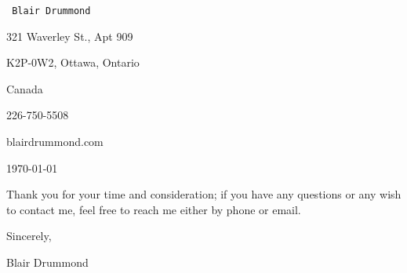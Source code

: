 

% 
% 

\enablehyperlinks


\newif\ifcanada


{\tt
\startright
Blair Drummond \par
321 Waverley St., Apt 909 \par
K2P-0W2, Ottawa, Ontario \par
Canada \par
226-750-5508 \par
blairdrummond\@protonmail.com \par
\bigskip
\today
\endright
}

\canadatrue



\bigskip
\bigskip

Thank you for your time and consideration; if you have any questions or any wish to contact me, feel free to reach me either by phone or email.

\ifcanada\else
\bigskip
{\it I am a Canadian citizen, but I am happy to relocate outside of Canada if sponsorship for a work visa is available.}
\fi

\bigskip

\noindent
Sincerely, \vskip 0.5cm

\noindent
{Blair Drummond}

\bye

